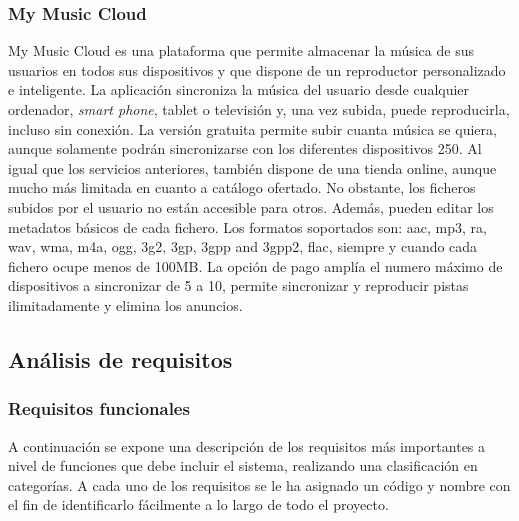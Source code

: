 \subsubsection{My Music Cloud \cite{MMC}}
My Music Cloud es una plataforma que permite almacenar la música de sus usuarios en todos sus dispositivos y que dispone de un reproductor personalizado e inteligente. La aplicación sincroniza la música del usuario desde cualquier ordenador, \textit{smart phone}, tablet o televisión y, una vez subida, puede reproducirla, incluso sin conexión. La versión gratuita permite subir cuanta música se quiera, aunque solamente podrán sincronizarse con los diferentes dispositivos 250. Al igual que los servicios anteriores, también dispone de una tienda online, aunque mucho más limitada en cuanto a catálogo ofertado. No obstante, los ficheros subidos por el usuario no están accesible para otros. Además, pueden editar los metadatos básicos de cada fichero. Los formatos soportados son: aac, mp3, ra, wav, wma, m4a, ogg, 3g2, 3gp, 3gpp and 3gpp2, flac, siempre y cuando cada fichero ocupe menos de 100MB. La opción de pago amplía el numero máximo de dispositivos a sincronizar de 5 a 10, permite sincronizar y reproducir pistas ilimitadamente y elimina los anuncios.

\subsection{Análisis de requisitos}

\subsubsection{Requisitos funcionales}
A continuación se expone una descripción de los requisitos más importantes a nivel de funciones que debe incluir el sistema, realizando una clasificación en categorías. A cada uno de los requisitos se le ha asignado un código y nombre con el fin de identificarlo fácilmente a lo largo de todo el proyecto.

